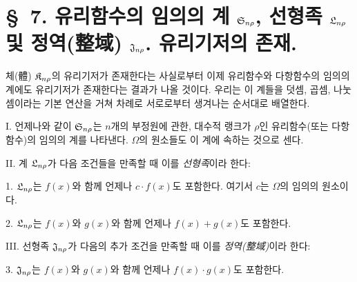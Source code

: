 \section*{\S\ 7. 유리함수의 임의의 계 $\mathfrak S_{n\rho}$, 선형족 $\mathfrak L_{n\rho}$ 및 정역(整域) $\mathfrak J_{n\rho}$. 유리기저의 존재.}

체(體) $\mathfrak K_{n\rho}$의 유리기저가 존재한다는 사실로부터 이제 유리함수와 다항함수의 임의의 계에도 유리기저가 존재한다는 결과가 나올 것이다. 우리는 이 계들을 덧셈, 곱셈, 나눗셈이라는 기본 연산을 거쳐 차례로 서로로부터 생겨나는 순서대로 배열한다.

I. 언제나와 같이 $\mathfrak S_{n\rho}$는 $n$개의 부정원에 관한, 대수적 랭크가 $\rho$인 유리함수(또는 다항함수)의 임의의 계를 나타낸다. $\Omega$의 원소들도 이 계에 속하는 것으로 센다.

II. 계 $\mathfrak L_{n\rho}$가 다음 조건들을 만족할 때 이를 \emph{선형족}이라 한다:

1. $\mathfrak L_{n\rho}$는 $f(x)$와 함께 언제나 $c\cdot f(x)$도 포함한다. 여기서 $c$는 $\Omega$의 임의의 원소이다.

2. $\mathfrak L_{n\rho}$는 $f(x)$와 $g(x)$와 함께 언제나 $f(x)+g(x)$도 포함한다.

III. 선형족 $\mathfrak J_{n\rho}$가 다음의 추가 조건을 만족할 때 이를 \emph{정역(整域)}이라 한다:

3. $\mathfrak J_{n\rho}$는 $f(x)$와 $g(x)$와 함께 언제나 $f(x)\cdot g(x)$도 포함한다.

